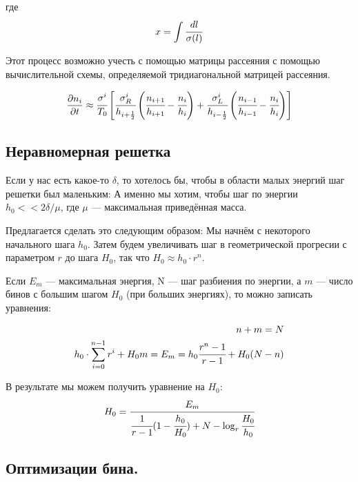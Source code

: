 где 
\begin{equation*}
	x = \int{\cfrac{dl}{\sigma(l)}}
\end{equation*}

Этот процесс возможно учесть с помощью матрицы рассеяния с помощью вычислительной схемы, определяемой тридиагональной матрицей рассеяния.

\begin{equation*}
	\frac{\partial n_i}{\partial t} \approx  \cfrac{\sigma^i}{T_0} 
	\left[\cfrac{\sigma^i_R}{h_{i+\frac{1}{2}}} 
		\left(\cfrac{n_{i+1}}{h_{i+1}}-\cfrac{n_{i}}{h_{i}}\right) +
		\cfrac{\sigma^i_L}{h_{i-\frac{1}{2}}}
		\left(\cfrac{n_{i-1}}{h_{i-1}}-\cfrac{n_{i}}{h_{i}}\right) 
	\right]
\end{equation*}

\subsection{Неравномерная решетка}
Если у нас есть какое-то $\delta$, то хотелось бы, чтобы в области малых энергий шаг решетки был маленьким: А именно мы хотим, чтобы шаг по энергии $h_0 << 2\delta/\mu$, где $\mu$ --- максимальная приведённая масса. 

Предлагается сделать это следующим образом:
Мы начнём с некоторого начального шага $h_0$. Затем будем увеличивать шаг в геометрической прогресии с параметром $r$ до шага $H_0$, так что $H_0 \approx h_0\cdot r^n$.

Если $E_{m}$ --- максимальная энергия, N --- шаг разбиения по энергии, а $m$ --- число бинов с большим шагом $H_0$ (при больших энергиях), то можно записать уравнения:

\begin{eqnarray*}
	n+m = N \\
	h_0 \cdot \sum_{i=0}^{n-1}{r^i} + H_0 m = E_{m} = h_0 \cfrac{r^n-1}{r-1} + H_0 (N-n)
\end{eqnarray*}

В результате мы можем получить уравнение на $H_0$:
\begin{equation*}
	H_0 = \cfrac{E_m}{ \cfrac{1}{r-1} (1-\cfrac{h_0}{H_0}) + N - \log_{r}{\cfrac{H_0}{h_0}}}
\end{equation*}

\subsection{Оптимизации бина.}


